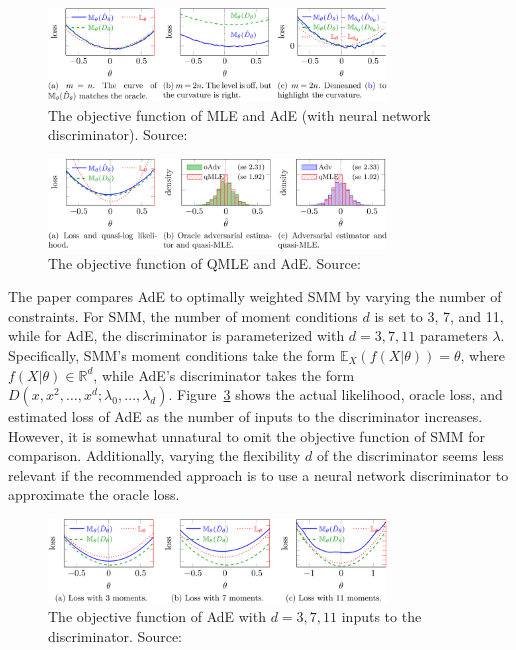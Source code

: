 \documentclass[12pt]{article}
\begin{document}
\begin{figure}[h!]
    \centering
    \includegraphics[width=0.8\textwidth]{../Figures/MLE_AdE_NN.png}
    \caption{The objective function of MLE and AdE (with neural network discriminator). Source: \citet{kaji2023adversarial}}
    \label{fig:MLE_AdE_NN}
\end{figure}

\begin{figure}[h!]
    \centering
    \includegraphics[width=0.8\textwidth]{../Figures/QMLE_AdE.png}
    \caption{The objective function of QMLE and AdE. Source: \citet{kaji2023adversarial}}
    \label{fig:QMLE_AdE}
\end{figure}

The paper compares AdE to optimally weighted SMM by varying the number of
constraints. For SMM, the number of moment conditions \(d\) is set to 3, 7, and
11, while for AdE, the discriminator is parameterized with \(d = 3, 7, 11\)
parameters \(\lambda\). Specifically, SMM's moment conditions take the form
\(\mathbb{E}_X(f(X|\theta)) = \theta\), where \(f(X|\theta) \in \mathbb{R}^d\),
while AdE's discriminator takes the form \(D(x, x^2, \dots, x^d; \lambda_0,
\dots, \lambda_d)\). Figure~\ref{fig:SMM_AdE} shows the actual likelihood,
oracle loss, and estimated loss of AdE as the number of inputs to the
discriminator increases. However, it is somewhat unnatural to omit the
objective function of SMM for comparison. Additionally, varying the flexibility
\(d\) of the discriminator seems less relevant if the recommended approach is
to use a neural network discriminator to approximate the oracle loss.

\begin{figure}[h!]
    \centering
    \includegraphics[width=0.8\textwidth]{../Figures/SMM_AdE.png}
    \caption{The objective function of AdE with \(d = 3, 7, 11\) inputs to the discriminator. Source: \citet{kaji2023adversarial}}
    \label{fig:SMM_AdE}
\end{figure}
\end{document}
